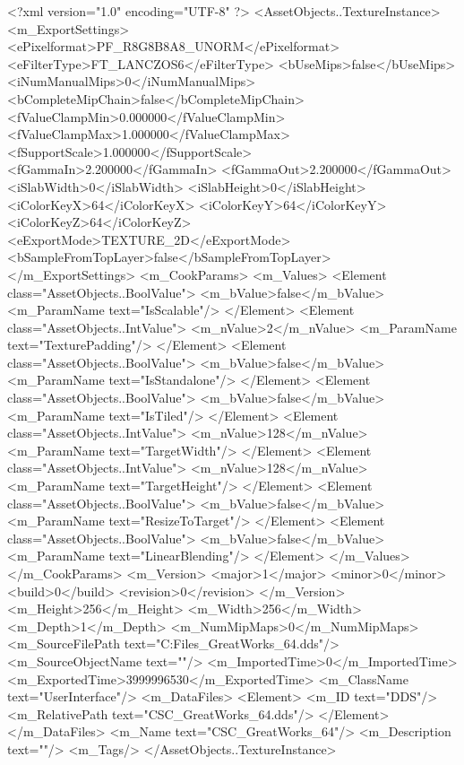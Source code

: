 <?xml version="1.0" encoding="UTF-8" ?>
<AssetObjects..TextureInstance>
	<m_ExportSettings>
		<ePixelformat>PF_R8G8B8A8_UNORM</ePixelformat>
		<eFilterType>FT_LANCZOS6</eFilterType>
		<bUseMips>false</bUseMips>
		<iNumManualMips>0</iNumManualMips>
		<bCompleteMipChain>false</bCompleteMipChain>
		<fValueClampMin>0.000000</fValueClampMin>
		<fValueClampMax>1.000000</fValueClampMax>
		<fSupportScale>1.000000</fSupportScale>
		<fGammaIn>2.200000</fGammaIn>
		<fGammaOut>2.200000</fGammaOut>
		<iSlabWidth>0</iSlabWidth>
		<iSlabHeight>0</iSlabHeight>
		<iColorKeyX>64</iColorKeyX>
		<iColorKeyY>64</iColorKeyY>
		<iColorKeyZ>64</iColorKeyZ>
		<eExportMode>TEXTURE_2D</eExportMode>
		<bSampleFromTopLayer>false</bSampleFromTopLayer>
	</m_ExportSettings>
	<m_CookParams>
		<m_Values>
			<Element class="AssetObjects..BoolValue">
				<m_bValue>false</m_bValue>
				<m_ParamName text="IsScalable"/>
			</Element>
			<Element class="AssetObjects..IntValue">
				<m_nValue>2</m_nValue>
				<m_ParamName text="TexturePadding"/>
			</Element>
			<Element class="AssetObjects..BoolValue">
				<m_bValue>false</m_bValue>
				<m_ParamName text="IsStandalone"/>
			</Element>
			<Element class="AssetObjects..BoolValue">
				<m_bValue>false</m_bValue>
				<m_ParamName text="IsTiled"/>
			</Element>
			<Element class="AssetObjects..IntValue">
				<m_nValue>128</m_nValue>
				<m_ParamName text="TargetWidth"/>
			</Element>
			<Element class="AssetObjects..IntValue">
				<m_nValue>128</m_nValue>
				<m_ParamName text="TargetHeight"/>
			</Element>
			<Element class="AssetObjects..BoolValue">
				<m_bValue>false</m_bValue>
				<m_ParamName text="ResizeToTarget"/>
			</Element>
			<Element class="AssetObjects..BoolValue">
				<m_bValue>false</m_bValue>
				<m_ParamName text="LinearBlending"/>
			</Element>
		</m_Values>
	</m_CookParams>
	<m_Version>
		<major>1</major>
		<minor>0</minor>
		<build>0</build>
		<revision>0</revision>
	</m_Version>
	<m_Height>256</m_Height>
	<m_Width>256</m_Width>
	<m_Depth>1</m_Depth>
	<m_NumMipMaps>0</m_NumMipMaps>
	<m_SourceFilePath text="C:\Users\Shadow\Desktop\Working Files\Icons\GreatWorks\CSC_GreatWorks_64.dds"/>
	<m_SourceObjectName text=""/>
	<m_ImportedTime>0</m_ImportedTime>
	<m_ExportedTime>3999996530</m_ExportedTime>
	<m_ClassName text="UserInterface"/>
	<m_DataFiles>
		<Element>
			<m_ID text="DDS"/>
			<m_RelativePath text="CSC_GreatWorks_64.dds"/>
		</Element>
	</m_DataFiles>
	<m_Name text="CSC_GreatWorks_64"/>
	<m_Description text=""/>
	<m_Tags/>
</AssetObjects..TextureInstance>

